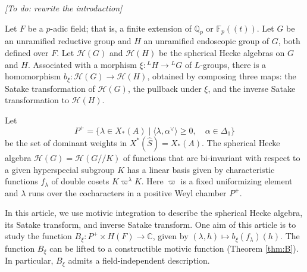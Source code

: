 
% 
% 


\newcommand{\XX}[1]{{\it  [To do: #1]}}
\newcommand{\ring}[1]{\mathbb{#1}}
\newcommand{\ang}[1]{\langle{#1}\rangle}
\def\op#1{{\operatorname{#1}}}
\def\inv{\op{inv}}
\def\dom{P^+}
\def\Q{{\ring{Q}}}
\def\card{\op{card}}
\def\CSrho{[W_S\backslash C_\rho]}

\def\C{\mathcal C}
\def\N{\mathcal N}
\def\H{\mathcal H}
\def\M{\mathcal M}
\def\T{\mathcal T}

\def\n{{\mathfrak n}}
\def\g{{\mathfrak g}}
\def\t{{\mathfrak t}}
\def\h{{\mathfrak h}}

\def\Frob{\op{Frob}}
\def\dotw{\dot w}
\def\uu{\tilde\upsilon}

\def\libel#1{{\text{\sc [#1]~}}\label{#1}}
\def\rif#1{(\ref{#1}-{\text{\sc #1})}}




\XX{rewrite the  introduction}




Let $F$ be a $p$-adic field; that is, a finite extension of
$\ring{Q}_p$ or $\ring{F}_p((t))$.  Let $G$ be an unramified reductive
group and $H$ an unramified endoscopic group of $G$, both defined over
$F$.  Let $\H(G)$ and $\H(H)$ be the spherical Hecke algebras on $G$
and $H$.  Associated with a morphism $\xi:{}^LH\to {}^LG$ of
$L$-groups, there is a homomorphism $b_\xi:\H(G)\to \H(H)$, obtained
by composing three maps: the Satake transformation of $\H(G)$, the
pullback under $\xi$, and the inverse Satake transformation to
$\H(H)$.

Let
\[
\dom = \{\lambda\in X_*(A) \mid \ang{\lambda,\alpha^\vee}\ge 0,
\quad \alpha\in \Delta_1\}
\]
be the set of dominant weights in $X^*(\hat S)=X_*(A)$.  The spherical
Hecke algebra $\H(G)=\H(G//K)$ of functions that are bi-invariant with
respect to a given hyperspecial subgroup $K$ has a linear basis given
by characteristic functions $f_\lambda$ of double cosets
$K\varpi^\lambda K$.  Here $\varpi$ is a fixed uniformizing element
and $\lambda$ runs over the cocharacters in a positive Weyl chamber
$P^+$.

In this article, we use motivic integration to describe the spherical
Hecke algebra, its Satake transform, and inverse Satake transform.
One aim of this article is to study the function $B_\xi:P^+\times
H(F)\to \ring{C}$, given by $(\lambda,h)\mapsto b_\xi(f_\lambda)(h)$.
The function $B_\xi$ can be lifted to a constructible motivic function
(Theorem \ref{thm:B}).  In particular, $B_\xi$ admits a
field-independent description.

